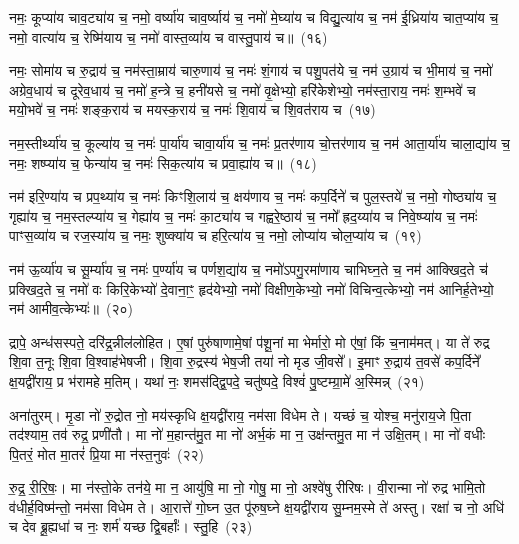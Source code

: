 नमः॒ कूप्या॑य चाव॒ट्या॑य च॒ नमो॒ वर्ष्या॑य चाव॒र्ष्याय॑ च॒ नमो॑ मे॒घ्या॑य च विद्यु॒त्या॑य च॒ नम॑ ई॒ध्रिया॑य चात॒प्या॑य च॒ नमो॒ वात्या॑य च॒ रेष्मि॑याय च॒ नमो॑ वास्त॒व्या॑य च वास्तु॒पाय॑ च॥~(१६)

{\anuvakamend[{वै॒श॒न्ताय॑ च त्रि॒ꣳ॒शच्च॑}]}%

नमः॒ सोमा॑य च रु॒द्राय॑ च॒ नम॑स्ता॒म्राय॑ चारु॒णाय॑ च॒ नमः॑ शं॒गाय॑ च पशु॒पत॑ये च॒ नम॑ उ॒ग्राय॑ च भी॒माय॑ च॒ नमो॑ अग्रेव॒धाय॑ च दूरेव॒धाय॑ च॒ नमो॑ ह॒न्त्रे च॒ हनी॑यसे च॒ नमो॑ वृ॒क्षेभ्यो॒ हरि॑केशेभ्यो॒ नम॑स्ता॒राय॒ नमः॑ श॒म्भवे॑ च मयो॒भवे॑ च॒ नमः॑ शङ्क॒राय॑ च मयस्क॒राय॑ च॒ नमः॑ शि॒वाय॑ च शि॒वत॑राय च~(१७)

नम॒स्तीर्थ्या॑य च॒ कूल्या॑य च॒ नमः॑ पा॒र्या॑य चावा॒र्या॑य च॒ नमः॑ प्र॒तर॑णाय चो॒त्तर॑णाय च॒ नम॑ आता॒र्या॑य चाला॒द्या॑य च॒ नमः॒ शष्प्या॑य च॒ फेन्या॑य च॒ नमः॑ सिक॒त्या॑य च प्रवा॒ह्या॑य च॥~(१८)

{\anuvakamend[{शि॒वत॑राय च त्रि॒ꣳ॒शच्च॑}]}%

नम॑ इरि॒ण्या॑य च प्रप॒थ्या॑य च॒ नमः॑ किꣳशि॒लाय॑ च॒ क्षय॑णाय च॒ नमः॑ कप॒र्दिने॑ च पुल॒स्तये॑ च॒ नमो॒ गोष्ठ्या॑य च॒ गृह्या॑य च॒ नम॒स्तल्प्या॑य च॒ गेह्या॑य च॒ नमः॑ का॒ट्या॑य च गह्वरे॒ष्ठाय॑ च॒ नमो᳚ ह्रद॒य्या॑य च निवे॒ष्प्या॑य च॒ नमः॑ पाꣳस॒व्या॑य च रज॒स्या॑य च॒ नमः॒ शुष्क्या॑य च हरि॒त्या॑य च॒ नमो॒ लोप्या॑य चोल॒प्या॑य च~(१९)

नम॑ ऊ॒र्व्या॑य च सू॒र्म्या॑य च॒ नमः॑ प॒र्ण्या॑य च पर्णश॒द्या॑य च॒ नमो॑\-ऽपगु॒रमा॑णाय चाभिघ्न॒ते च॒ नम॑ आक्खिद॒ते च॑ प्रक्खिद॒ते च॒ नमो॑ वः किरि॒केभ्यो॑ दे॒वाना॒ꣳ॒ हृद॑येभ्यो॒ नमो॑ विक्षीण॒केभ्यो॒ नमो॑ विचिन्व॒त्केभ्यो॒ नम॑ आनिर्\mbox{}ह॒तेभ्यो॒ नम॑ आमीव॒त्केभ्यः॑॥~(२०)

{\anuvakamend[{उ॒ल॒प्या॑य च॒ त्रय॑स्त्रिꣳशच्च}]}%

द्रापे॒ अन्ध॑सस्पते॒ दरि॑द्र॒न्नील॑लोहित। ए॒षां पुरु॑षाणामे॒षां प॑शू॒नां मा भेर्मारो॒ मो ए॑षां॒ किं च॒नाम॑मत्। या ते॑ रुद्र शि॒वा त॒नूः शि॒वा वि॒श्वाह॑भेषजी। शि॒वा रु॒द्रस्य॑ भेष॒जी तया॑ नो मृड जी॒वसे᳚। इ॒माꣳ रु॒द्राय॑ त॒वसे॑ कप॒र्दिने᳚ क्ष॒यद्वी॑राय॒ प्र भ॑रामहे म॒तिम्। यथा॑ नः॒ शमस॑द्द्वि॒पदे॒ चतु॑ष्पदे॒ विश्वं॑ पु॒ष्टम्ग्रा॒मे॑ अ॒स्मिन्न्~(२१)

अना॑तुरम्। मृ॒डा नो॑ रु॒द्रोत नो॒ मय॑स्कृधि क्ष॒यद्वी॑राय॒ नम॑सा विधेम ते। यच्छं च॒ योश्च॒ मनु॑राय॒जे पि॒ता तद॑श्याम॒ तव॑ रुद्र॒ प्रणी॑तौ। मा नो॑ म॒हान्त॑मु॒त मा नो॑ अर्भ॒कं मा न॒ उक्ष॑न्तमु॒त मा न॑ उक्षि॒तम्। मा नो॑ वधीः पि॒तरं॒ मोत मा॒तरं॑ प्रि॒या मा न॑स्त॒नुवः॑~(२२)

रु॒द्र॒ री॒रि॒षः॒। मा न॑स्तो॒के तन॑ये॒ मा न॒ आयु॑षि॒ मा नो॒ गोषु॒ मा नो॒ अश्वे॑षु रीरिषः। वी॒रान्मा नो॑ रुद्र भामि॒तो व॑धीर्\mbox{}ह॒विष्म॑न्तो॒ नम॑सा विधेम ते। आ॒रात्ते॑ गो॒घ्न उ॒त पू॑रुष॒घ्ने क्ष॒यद्वी॑राय सु॒म्नम॒स्मे ते॑ अस्तु। रक्षा॑ च नो॒ अधि॑ च देव ब्रू॒ह्यधा॑ च नः॒ शर्म॑ यच्छ द्वि॒बर्\mbox{}हाः᳚। स्तु॒हि~(२३)

